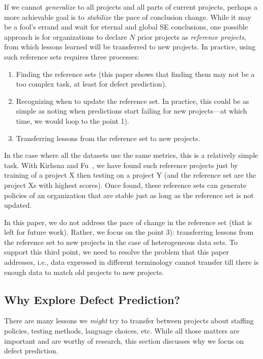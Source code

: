 If we cannot {\em generalize} to all projects and all parts
of current projects, perhaps a more achievable goal is to {\em stabilize} the pace of conclusion change.
While it may be
a fool's errand and wait for eternal and global SE
conclusions, one possible approach is for organizations
to declare $N$ prior projects as {\em reference projects},
from which lessons learned will be transferred to new projects.
In practice, using such reference sets requires three processes:
\begin{enumerate}
\item Finding the reference sets (this paper shows that finding
  them may not be a too complex task, at least for defect prediction).
  \item Recognizing when to update the reference set. In practice,
  this could be as simple as noting when predictions start failing for new projects---at which time, we would loop to the point 1).
\item Transferring
  lessons from the reference set to new projects.
\end{enumerate}
In the case where all the datasets use the same metrics, this is a relatively
simple task. With Kirhsna and Fu~\cite{krishna16}, we have found such reference projects just by training of
a project X then testing on a project Y (and the reference set are the project Xs with highest scores).
Once found, these reference sets can generate policies of an organization that are
stable just as long as the reference set is not updated.

In this paper, we do not address the pace of change in the reference set
(that is left for future work).
Rather, we focus on the point 3): transferring lessons from
the reference set to new projects in the case of heterogeneous data sets. To support this third point,
we need to resolve the problem
  that this paper addresses, i.e., data expressed in different terminology
  cannot transfer till there is enough data to match old projects to new projects.




\subsection{Why Explore Defect Prediction?}

There are many lessons we {\em might} try to transfer between projects
about staffing policies, testing methods, language choices, etc. While
all those matters are important and are worthy of research, this section
discusses why we focus on defect prediction.

